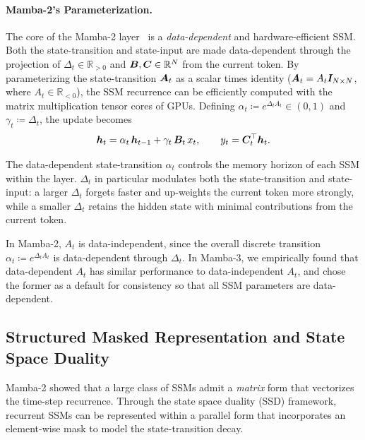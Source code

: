 \paragraph{Mamba-2's Parameterization.}
The core of the Mamba-2 layer~\citep{dao2024transformersssmsgeneralizedmodels} is a \emph{data-dependent} and hardware-efficient SSM.
Both the state-transition and state-input are made data-dependent through the projection of $\Delta_t \in \mathbb{R}_{>0}$ and ${\bm{B}}, {\bm{C}}\in\mathbb{R}^N$ from the current token.
By parameterizing the state-transition ${\bm{A}}_t$ as a scalar times identity (${\bm{A}}_t = A_t \bm{I}_{N\times N}$, where 
$A_t \in \mathbb{R}_{<0}$), the SSM recurrence can be efficiently computed with the matrix multiplication tensor cores of GPUs.
Defining $\alpha_t \coloneqq e^{\Delta_t A_t}\in(0,1)$ and $\gamma_t \coloneqq \Delta_t$, the update becomes
\begin{equation}
\label{eq:mamba2-recurrence-prelim}
{\bm{h}}_t = \alpha_t\,{\bm{h}}_{t-1} + \gamma_t\,{\bm{B}}_t\,x_t, \qquad
y_t = {\bm{C}}_t^\top {\bm{h}}_t .
\end{equation}

The data-dependent state-transition $\alpha_t$ controls the memory horizon of each SSM within the layer.
$\Delta_t$ in particular modulates both the state-transition and state-input: a larger $\Delta_t$ forgets faster and up-weights the current token more strongly, while a smaller $\Delta_t$ retains the hidden state with minimal contributions from the current token.

\begin{remark}
In Mamba-2, $A_t$ is data-independent, since the overall discrete transition $\alpha_t \coloneqq e^{\Delta_t A_t}$ is data-dependent through $\Delta_t$.
In Mamba-3, we empirically found that data-dependent $A_t$ has similar performance to data-independent $A_t$, and chose the former as a default for consistency so that all SSM parameters are data-dependent.
\end{remark}

\subsection{Structured Masked Representation and State Space Duality}
\label{sec:prelim-sma}
Mamba-2 showed that a large class of SSMs admit a \emph{matrix} form that vectorizes the time-step recurrence.
Through the state space duality (SSD) framework, recurrent SSMs can be represented within a parallel form that incorporates an element-wise mask to model the state-transition decay.

